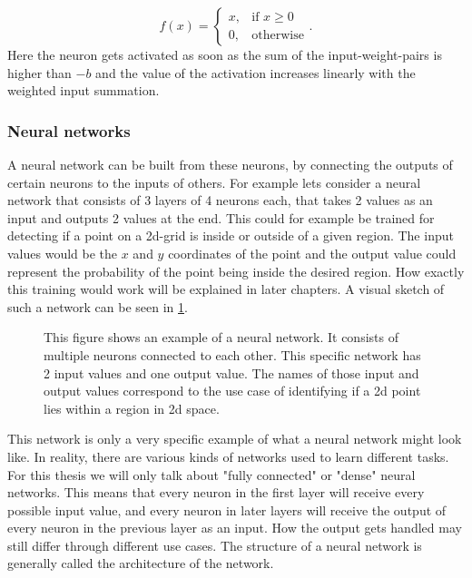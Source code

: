 \begin{equation}
	f(x) = 
	\begin{cases}
		x, &\text{if } x\geq0 \\
		0, &\text{otherwise}
	\end{cases}.
\end{equation}
Here the neuron gets activated as soon as the sum of the input-weight-pairs is higher than $-b$ and the value of the activation increases linearly with the weighted input summation.
\subsubsection{Neural networks}
A neural network can be built from these neurons, by connecting the outputs of certain neurons to the inputs of others. For example lets consider a neural network that consists of 3 layers of 4 neurons each, that takes 2 values as an input and outputs 2 values at the end. This could for example be trained for detecting if a point on a 2d-grid is inside or outside of a given region. The input values would be the $x$ and $y$ coordinates of the point and the output value could represent the probability of the point being inside the desired region. How exactly this training would work will be explained in later chapters. A visual sketch of such a network can be seen in \cref{fig:Neural_network_example}. \\
\begin{figure}
	\centering
	
	\caption{This figure shows an example of a neural network. It consists of multiple neurons connected to each other. This specific network has 2 input values and one output value. The names of those input and output values correspond to the use case of identifying if a 2d point lies within a region in 2d space.}
	\label{fig:Neural_network_example}
\end{figure}
This network is only a very specific example of what a neural network might look like. In reality, there are various kinds of networks used to learn different tasks. For this thesis we will only talk about "fully connected" or "dense" neural networks. This means that every neuron in the first layer will receive every possible input value, and every neuron in later layers will receive the output of every neuron in the previous layer as an input. How the output gets handled may still differ through different use cases. The structure of a neural network is generally called the architecture of the network. 